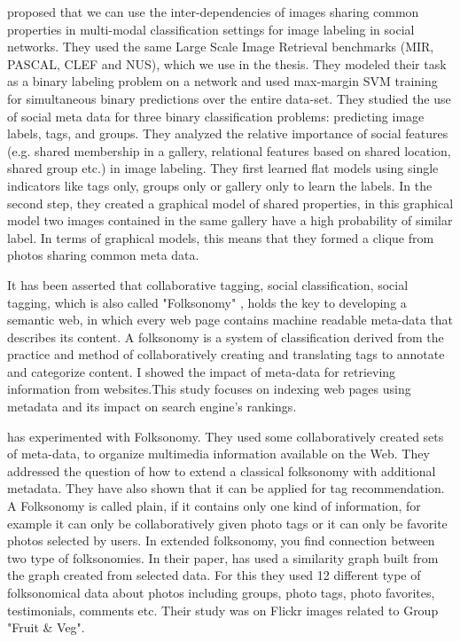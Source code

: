 \citet*{McAuley} proposed that  we can use the inter-dependencies of images sharing common properties in multi-modal classification settings for image labeling in social networks. They used the same Large Scale Image Retrieval benchmarks (MIR, PASCAL, CLEF and NUS), which we use in the thesis. They modeled their task as a binary labeling problem on a network and used 
max-margin SVM training for simultaneous binary predictions over the entire data-set.
They studied the use of social meta data for three binary 
classification problems: predicting image labels, tags, and groups. 
They analyzed the relative importance of social features (e.g. 
shared membership in a gallery, relational features based on shared 
location, shared group etc.) in image labeling. They first learned 
flat models using single indicators like tags only, groups only or 
gallery only to learn the labels. In the second step, they created a 
graphical model of shared properties, in this graphical model two 
images contained in the same gallery have a high probability of 
similar label. In terms of graphical models, this means that they 
formed a clique from photos sharing common meta data.

It has been asserted that collaborative tagging, social classification, social tagging, which is also called "Folksonomy" 
\citet*{wikiFolksonomy}, holds the key to developing a semantic web, in 
which every web page contains machine readable meta-data that 
describes its content. A folksonomy is a system of classification derived from the practice and method of collaboratively creating and translating tags to annotate and categorize content.  I\citet*{webResource} showed the impact of meta-data for retrieving information 
from websites.This study focuses on indexing web pages using metadata and its impact on search engine's rankings.

 has experimented with Folksonomy. They used some collaboratively created sets of meta-data, to organize multimedia information available on the Web. They addressed the question of how to extend a classical folksonomy with additional metadata. They have also shown that it can be applied for tag recommendation. 
 A Folksonomy is called plain, if it contains only one kind of information, for example it can only be collaboratively given photo tags or it can only be favorite photos selected by users. In extended folksonomy, you find connection between two type of folksonomies. In their paper, \citet*{kern} has used a similarity graph built from the graph created from selected data. For this they used 12 different type of folksonomical data about photos including groups, photo tags, photo favorites, testimonials, comments etc. Their study was on Flickr images related to Group "Fruit \& Veg".

